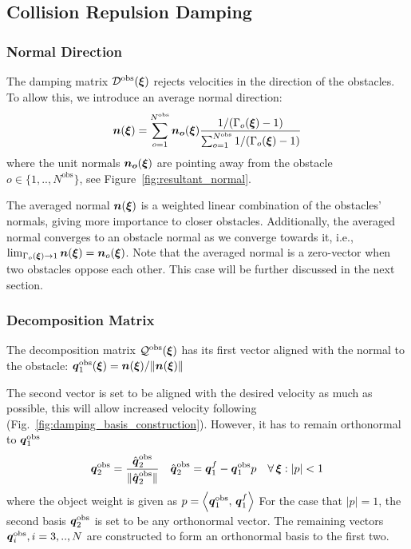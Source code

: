 \subsection{Collision Repulsion Damping} \label{sec:obstacle_repulsion}

\subsubsection{Normal Direction}
The damping matrix $\mathcal{D}^{\mathrm{obs}}(\boldsymbol{\xi})$ rejects velocities in the direction of the obstacles. To allow this, we introduce an average normal direction:
\begin{equation}
  \vecs n(\vecs\xi) = \sum_{o=1}^{N^{\mathrm{obs}}} \vecs{n_o}(\vecs\xi)
  \frac{1 / (\Gamma_o(\vecs \xi) - 1)}{\sum_{o=1}^{N^\mathrm{obs}} 1 / (\Gamma_o(\vecs \xi) - 1)}
  \label{eq:averaged_normal}
\end{equation}
 where the unit normals $\boldsymbol{n_o} (\boldsymbol{\xi})$  are pointing away from the obstacle $o \in \{1,  ..,  N^{\mathrm{obs}} \}$, see Figure~\ref{fig:resultant_normal}. 

The averaged normal $\boldsymbol{n}(\boldsymbol{\xi})$ is a weighted linear combination of the obstacles' normals, giving more importance to closer obstacles.
Additionally, the averaged normal converges to an obstacle normal as we converge towards it, i.e., $\lim_{\Gamma_o(\boldsymbol{\xi}) \rightarrow 1} \boldsymbol{n}(\boldsymbol{\xi}) = \boldsymbol{n}_o(\boldsymbol{\xi})$.
Note that the averaged normal is a zero-vector when two obstacles oppose each other. This case will be further discussed in the next section.

\subsubsection{Decomposition Matrix}
The decomposition matrix $\mathcal{Q}^{\mathrm{obs}}(\boldsymbol{\xi})$ has its first vector aligned with the normal to the obstacle:  $\boldsymbol{q}_1^{\mathrm{obs}}(\boldsymbol{\xi}) =  \boldsymbol{n}(\boldsymbol{\xi}) / \lVert\boldsymbol{n}(\boldsymbol{\xi})\rVert$ 

The second vector is set to be aligned with the desired velocity as much as possible, this will allow increased velocity following (Fig.~\ref{fig:damping_basis_construction}). However, it has to remain orthonormal to $\boldsymbol{q}_1^{\mathrm{obs}}$
\begin{equation}
  \boldsymbol{q}_2^{\mathrm{obs}} = \frac{\hat{\boldsymbol{q}}_2^{\mathrm{obs}}}{\| \hat{\boldsymbol{q}}_2^{\mathrm{obs}} \|}
  \quad
  \hat{\boldsymbol{q}}_2^{\mathrm{obs}} = \boldsymbol{q}_1^{f} - \boldsymbol{q}_1^{\mathrm{obs}} p \quad  \forall \, \boldsymbol{\xi} : | p | < 1
\end{equation}
where the object weight is given as $p = \left\langle {\boldsymbol{q}_1^{\mathrm{obs}}}, \, {\boldsymbol{q}_1^{f}} \right\rangle$
For the case that $| p | = 1$, the second basis $\boldsymbol{q}_2^{\mathrm{obs}}$ is set to be any orthonormal vector. The remaining vectors $\boldsymbol{q}_i^{\mathrm{obs}}, i = 3, .., N$ are constructed to form an orthonormal basis to the first two.

